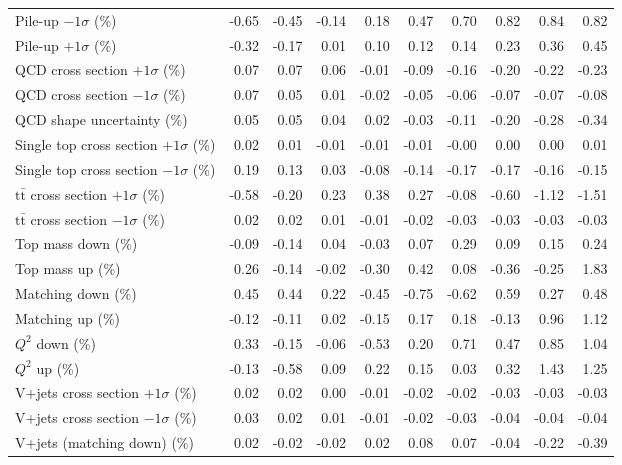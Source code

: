 \begin{table}[htbp]
{\begin{tabular}{lrrrrrrrrr}
Pile-up $-1\sigma$ (\%) & -0.65 & -0.45 & -0.14 & 0.18 & 0.47 & 0.70 & 0.82 & 0.84 & 0.82 \\ 
Pile-up $+1\sigma$ (\%) & -0.32 & -0.17 & 0.01 & 0.10 & 0.12 & 0.14 & 0.23 & 0.36 & 0.45 \\ 
QCD cross section \ensuremath{+1\sigma} (\%) & 0.07 & 0.07 & 0.06 & -0.01 & -0.09 & -0.16 & -0.20 & -0.22 & -0.23 \\ 
QCD cross section \ensuremath{-1\sigma} (\%) & 0.07 & 0.05 & 0.01 & -0.02 & -0.05 & -0.06 & -0.07 & -0.07 & -0.08 \\ 
QCD shape uncertainty (\%) & 0.05 & 0.05 & 0.04 & 0.02 & -0.03 & -0.11 & -0.20 & -0.28 & -0.34 \\ 
Single top cross section $+1\sigma$ (\%) & 0.02 & 0.01 & -0.01 & -0.01 & -0.01 & -0.00 & 0.00 & 0.00 & 0.01 \\ 
Single top cross section $-1\sigma$ (\%) & 0.19 & 0.13 & 0.03 & -0.08 & -0.14 & -0.17 & -0.17 & -0.16 & -0.15 \\ 
$\mathrm{t}\bar{\mathrm{t}}$ cross section $+1\sigma$ (\%) & -0.58 & -0.20 & 0.23 & 0.38 & 0.27 & -0.08 & -0.60 & -1.12 & -1.51 \\ 
$\mathrm{t}\bar{\mathrm{t}}$ cross section $-1\sigma$ (\%) & 0.02 & 0.02 & 0.01 & -0.01 & -0.02 & -0.03 & -0.03 & -0.03 & -0.03 \\ 
Top mass down (\%) & -0.09 & -0.14 & 0.04 & -0.03 & 0.07 & 0.29 & 0.09 & 0.15 & 0.24 \\ 
Top mass up (\%) & 0.26 & -0.14 & -0.02 & -0.30 & 0.42 & 0.08 & -0.36 & -0.25 & 1.83 \\ 
Matching down (\%) & 0.45 & 0.44 & 0.22 & -0.45 & -0.75 & -0.62 & 0.59 & 0.27 & 0.48 \\ 
Matching up (\%) & -0.12 & -0.11 & 0.02 & -0.15 & 0.17 & 0.18 & -0.13 & 0.96 & 1.12 \\ 
$Q^{2}$ down (\%) & 0.33 & -0.15 & -0.06 & -0.53 & 0.20 & 0.71 & 0.47 & 0.85 & 1.04 \\ 
$Q^{2}$ up (\%) & -0.13 & -0.58 & 0.09 & 0.22 & 0.15 & 0.03 & 0.32 & 1.43 & 1.25 \\ 
V+jets cross section \ensuremath{+1\sigma} (\%) & 0.02 & 0.02 & 0.00 & -0.01 & -0.02 & -0.02 & -0.03 & -0.03 & -0.03 \\ 
V+jets cross section \ensuremath{-1\sigma} (\%) & 0.03 & 0.02 & 0.01 & -0.01 & -0.02 & -0.03 & -0.04 & -0.04 & -0.04 \\ 
V+jets (matching down) (\%) & 0.02 & -0.02 & -0.02 & 0.02 & 0.08 & 0.07 & -0.04 & -0.22 & -0.39 \\ 

\end{tabular}}
\end{table}
